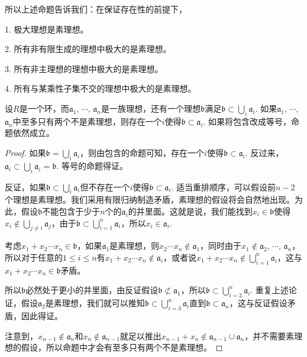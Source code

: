 所以上述命题告诉我们：在保证存在性的前提下，

	1. 极大理想是素理想。

	2. 所有非有限生成的理想中极大的是素理想。

	3. 所有非主理想的理想中极大的是素理想。

	4. 所有与某乘性子集不交的理想中极大的是素理想。

\begin{pro} \label{primeav}设$R$是一个环，而$\mathfrak{a}_1$, $\cdots$, $\mathfrak{a}_n$是一族理想，还有一个理想$\mathfrak{b}$满足$\mathfrak{b}\subset \bigcup_i \mathfrak{a}_i$. 如果$\mathfrak{a}_1$, $\cdots$, $\mathfrak{a}_n$中至多只有两个不是素理想，则存在一个$i$使得$\mathfrak{b}\subset \mathfrak{a}_i$. 如果将包含改成等号，命题依然成立。
\end{pro}

\begin{proof}
	如果$\mathfrak{b}=\bigcup_i \mathfrak{a}_i$，则由包含的命题可知，存在一个$i$使得$\mathfrak{b}\subset \mathfrak{a}_i$. 反过来，$\mathfrak{a}_i\subset \bigcup_i \mathfrak{a}_i=\mathfrak{b}$. 等号的命题得证。

	反证，如果$\mathfrak{b}\subset \bigcup_i \mathfrak{a}_i$但不存在一个$i$使得$\mathfrak{b}\subset \mathfrak{a}_i$. 适当重排顺序，可以假设前$n-2$个理想是素理想。我们采用有限归纳制造矛盾，素理想的假设将会自然地出现。为此，假设$\mathfrak{b}$不能包含于少于$n$个的$\mathfrak{a}_i$的并里面。这就是说，我们能找到$x_i\in \mathfrak{b}$使得$x_i\not\in \bigcup_{j\neq i}\mathfrak{a}_j$，由于$\mathfrak{b}\subset \bigcup_{i=1}^n \mathfrak{a}_i$，所以$x_i\in \mathfrak{a}_i$.

	考虑$x_1+x_2\cdots x_n\in \mathfrak{b}$，如果$\mathfrak{a}_1$是素理想，则$x_2\cdots x_n\not\in \mathfrak{a}_1$，同时由于$x_1\not\in \mathfrak{a}_2$, $\cdots$, $\mathfrak{a}_n$，所以对于任意的$1\leq i \leq n$有$x_1+x_2\cdots x_n\not\in \mathfrak{a}_i$，或者说$x_1+x_2\cdots x_n\not\in \bigcup_{i=1}^n \mathfrak{a}_i$，这与$x_1+x_2\cdots x_n\in \mathfrak{b}$矛盾。

	所以$\mathfrak{b}$必然处于更小的并里面，由反证假设$\mathfrak{b}\not\subset \mathfrak{a}_1$，所以$\mathfrak{b}\subset \bigcup_{i=2}^n \mathfrak{a}_i$. 重复上述论证，假设$\mathfrak{a}_2$是素理想，我们就可以推知$\mathfrak{b}\subset \bigcup_{i=3}^n \mathfrak{a}_i$直到$\mathfrak{b}\subset \mathfrak{a}_n$，这与反证假设矛盾，因此得证。 

	注意到，$x_{n-1}\not\in \mathfrak{a}_n$和$x_{n}\not\in \mathfrak{a}_{n-1}$就足以推出$x_{n-1}+x_{n}\not\in \mathfrak{a}_{n-1}\cup \mathfrak{a}_n$，并不需要素理想的假设，所以命题中才会有至多只有两个不是素理想。
\end{proof}

